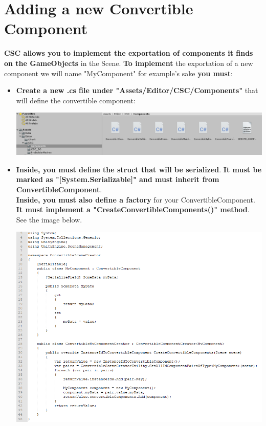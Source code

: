 \documentclass[10pt,a4paper]{article}
\begin{document}
\section{Adding a new Convertible Component}
\textbf{CSC allows you to implement the exportation of components it finds on the GameObjects} in the Scene. \textbf{To implement} the exportation of a new component we will name "MyComponent" for example's sake \textbf{you must}:
\begin{itemize}
\item \textbf{Create a new .cs file under "Assets/Editor/CSC/Components"} that will define the convertible component:
\begin{center}
\includegraphics[scale=0.5]{newComponentLocation}
\end{center}
\item \textbf{Inside, you must define the struct that will be serialized}. \textbf{It must be marked as "[System.Serializable]" and must inherit from ConvertibleComponent}.\\
\textbf{Inside, you must also define a factory} for your ConvertibleComponent. \textbf{It must implement a "CreateConvertibleComponents()" method}. See the image below.
\begin{center}
\includegraphics[scale=0.75]{newComponentDeclaration}
\end{center}

\end{itemize}
\end{document}

